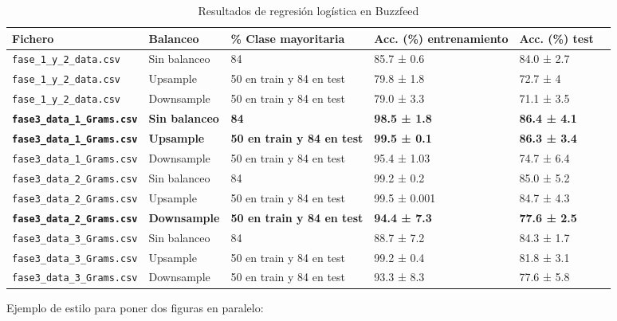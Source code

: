 \begin{refsection}
\begin{table}[hbtp]
\caption{Resultados de regresión logística en Buzzfeed}
\label{tab:BuzzfeedRL}
\begin{tabular}{m{}m{}m{}m{}m{}m{}}
\toprule
 Fichero & Balanceo & \% Clase mayoritaria & Acc. (\%) entrenamiento & Acc. (\%) test \\
\midrule
 \rowcolor{lightback}\nolinkurl{fase\_1\_y\_2\_data.csv} & Sin balanceo & 84 & 85.7  ± 0.6 & 84.0  ± 2.7 \\
 \rowcolor{lightback}\nolinkurl{fase\_1\_y\_2\_data.csv} & Upsample & 50 en train y 84 en test & 79.8  ± 1.8 & 72.7  ± 4 \\
 \rowcolor{lightback}\nolinkurl{fase\_1\_y\_2\_data.csv} & Downsample & 50 en train y 84 en test & 79.0  ± 3.3 & 71.1  ± 3.5 \\
 \bfseries\nolinkurl{fase3\_data\_1\_Grams.csv} & \bfseries Sin balanceo & \bfseries84 & \bfseries98.5  ± 1.8 & \bfseries86.4  ± 4.1 \\
 \bfseries\nolinkurl{fase3\_data\_1\_Grams.csv} & \bfseries Upsample & \bfseries 50 en train y 84 en test & \bfseries99.5  ± 0.1 & \bfseries86.3  ± 3.4 \\
 \nolinkurl{fase3\_data\_1\_Grams.csv} & Downsample & 50 en train y 84 en test & 95.4  ± 1.03 & 74.7  ± 6.4 \\
 \rowcolor{lightback}\nolinkurl{fase3\_data\_2\_Grams.csv} & Sin balanceo & 84 & 99.2  ± 0.2 & 85.0  ± 5.2 \\
 \rowcolor{lightback}\nolinkurl{fase3\_data\_2\_Grams.csv} & Upsample & 50 en train y 84 en test & 99.5  ± 0.001 & 84.7  ± 4.3 \\
 \rowcolor{lightback}\bfseries\nolinkurl{fase3\_data\_2\_Grams.csv} & \bfseries Downsample & \bfseries50 en train y 84 en test & \bfseries94.4  ± 7.3 & \bfseries77.6  ±  2.5 \\
 \nolinkurl{fase3\_data\_3\_Grams.csv} & Sin balanceo & 84 & 88.7  ± 7.2 & 84.3  ± 1.7 \\
 \nolinkurl{fase3\_data\_3\_Grams.csv} & Upsample & 50 en train y 84 en test & 99.2  ± 0.4 & 81.8  ± 3.1 \\
 \nolinkurl{fase3\_data\_3\_Grams.csv} & Downsample & 50 en train y 84 en test & 93.3  ± 8.3 & 77.6  ± 5.8 \\
\bottomrule
\end{tabular}
\end{table}


Ejemplo de estilo para poner dos figuras en paralelo:


\end{refsection}
